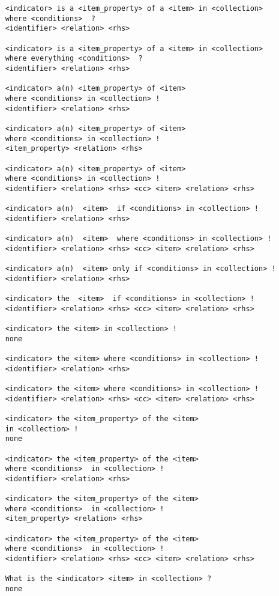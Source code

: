 \begin{verbatim}
    <indicator> is a <item_property> of a <item> in <collection> 
    where <conditions>  ?
    <identifier> <relation> <rhs>

    <indicator> is a <item_property> of a <item> in <collection>
    where everything <conditions>  ?
    <identifier> <relation> <rhs>

    <indicator> a(n) <item_property> of <item> 
    where <conditions> in <collection> !
    <identifier> <relation> <rhs>
    
    <indicator> a(n) <item_property> of <item> 
    where <conditions> in <collection> !
    <item_property> <relation> <rhs>

    <indicator> a(n) <item_property> of <item> 
    where <conditions> in <collection> !
    <identifier> <relation> <rhs> <cc> <item> <relation> <rhs>

    <indicator> a(n)  <item>  if <conditions> in <collection> !
    <identifier> <relation> <rhs>

    <indicator> a(n)  <item>  where <conditions> in <collection> !
    <identifier> <relation> <rhs> <cc> <item> <relation> <rhs>

    <indicator> a(n)  <item> only if <conditions> in <collection> !
    <identifier> <relation> <rhs>

    <indicator> the  <item>  if <conditions> in <collection> !
    <identifier> <relation> <rhs> <cc> <item> <relation> <rhs>

    <indicator> the <item> in <collection> !
    none

    <indicator> the <item> where <conditions> in <collection> !
    <identifier> <relation> <rhs>

    <indicator> the <item> where <conditions> in <collection> !
    <identifier> <relation> <rhs> <cc> <item> <relation> <rhs>

    <indicator> the <item_property> of the <item>
    in <collection> !
    none

    <indicator> the <item_property> of the <item> 
    where <conditions>  in <collection> !
    <identifier> <relation> <rhs>

    <indicator> the <item_property> of the <item> 
    where <conditions>  in <collection> !
    <item_property> <relation> <rhs>

    <indicator> the <item_property> of the <item> 
    where <conditions>  in <collection> !
    <identifier> <relation> <rhs> <cc> <item> <relation> <rhs>

    What is the <indicator> <item> in <collection> ?
    none


\end{verbatim}
